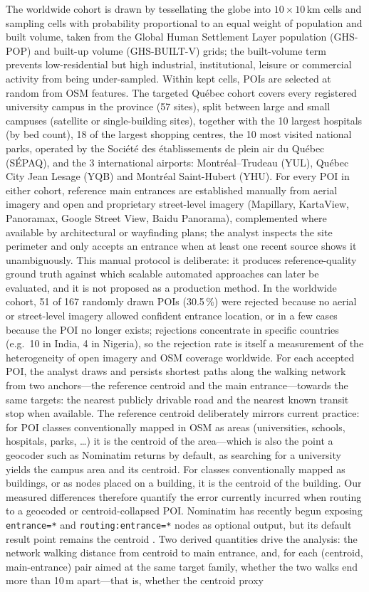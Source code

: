 \documentclass{osmscience}
\begin{document}
The worldwide cohort is drawn by tessellating the globe into $10\times10$\,km cells and sampling cells with probability proportional to an equal weight of population and built volume, taken from the Global Human Settlement Layer population (GHS-POP) and built-up volume (GHS-BUILT-V) grids; the built-volume term prevents low-residential but high industrial, institutional, leisure or commercial activity from being under-sampled. Within kept cells, POIs are selected at random from OSM features. The targeted Québec cohort covers every registered university campus in the province (57 sites), split between large and small campuses (satellite or single-building sites), together with the 10 largest hospitals (by bed count), 18 of the largest shopping centres, the 10 most visited national parks, operated by the Société des établissements de plein air du Québec (SÉPAQ), and the 3 international airports: Montréal--Trudeau (YUL), Québec City Jean Lesage (YQB) and Montréal Saint-Hubert (YHU). For every POI in either cohort, reference main entrances are established manually from aerial imagery and open and proprietary street-level imagery (Mapillary, KartaView, Panoramax, Google Street View, Baidu Panorama), complemented where available by architectural or wayfinding plans; the analyst inspects the site perimeter and only accepts an entrance when at least one recent source shows it unambiguously. This manual protocol is deliberate: it produces reference-quality ground truth against which scalable automated approaches \cite{Hu2021} can later be evaluated, and it is not proposed as a production method. In the worldwide cohort, 51 of 167 randomly drawn POIs (30.5\,\%) were rejected because no aerial or street-level imagery allowed confident entrance location, or in a few cases because the POI no longer exists; rejections concentrate in specific countries (e.g.\ 10 in India, 4 in Nigeria), so the rejection rate is itself a measurement of the heterogeneity of open imagery and OSM coverage worldwide. For each accepted POI, the analyst draws and persists shortest paths along the walking network from two anchors---the reference centroid and the main entrance---towards the same targets: the nearest publicly drivable road and the nearest known transit stop when available. The reference centroid deliberately mirrors current practice: for POI classes conventionally mapped in OSM as areas (universities, schools, hospitals, parks, \ldots) it is the centroid of the area---which is also the point a geocoder such as Nominatim returns by default, as searching for a university yields the campus area and its centroid. For classes conventionally mapped as buildings, or as nodes placed on a building, it is the centroid of the building. Our measured differences therefore quantify the error currently incurred when routing to a geocoded or centroid-collapsed POI. Nominatim has recently begun exposing \texttt{entrance=*} and \texttt{routing:entrance=*} nodes as optional output, but its default result point remains the centroid \cite{Nominatim2025}. Two derived quantities drive the analysis: the network walking distance from centroid to main entrance, and, for each (centroid, main-entrance) pair aimed at the same target family, whether the two walks end more than 10\,m apart---that is, whether the centroid proxy 
\end{document}
